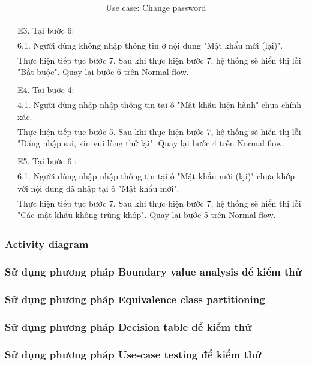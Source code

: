 \documentclass[a4paper, 12pt]{article}
\begin{document}
\begin{table}[H]
\begin{tabular}{|l|p{11cm}|}
        & \\
        & E3. Tại bước 6: \\
        & 6.1. Người dùng không nhập thông tin ở nội dung "Mật khẩu mới (lại)". \\
        & Thực hiện tiếp tục bước 7. Sau khi thực hiện bước 7, hệ thống sẽ hiển thị lỗi "Bắt buộc". Quay lại bước 6 trên Normal flow. \\
        & \\
        & E4. Tại bước 4: \\
        & 4.1. Người dùng nhập nhập thông tin tại ô "Mật khẩu hiện hành" chưa chính xác. \\
        & Thực hiện tiếp tục bước 5. Sau khi thực hiện bước 7, hệ thống sẽ hiển thị lỗi "Đăng nhập sai, xin vui lòng thử lại". Quay lại bước 4 trên Normal flow. \\
        & \\
        & E5. Tại bước 6 : \\
        & 6.1. Người dùng nhập nhập thông tin tại ô "Mật khẩu mới (lại)" chưa khớp với nội dung đã nhập tại ô "Mật khẩu mới". \\
        & Thực hiện tiếp tục bước 7. Sau khi thực hiện bước 7, hệ thống sẽ hiển thị lỗi "Các mật khẩu không trùng khớp". Quay lại bước 5 trên Normal flow. \\
        \hline
    \end{tabular}
    \caption{Use case: Change password}
    \label{Use case: Change password}
\end{table}
\subsubsection{Activity diagram}
\subsubsection{Sử dụng phương pháp Boundary value analysis để kiểm thử}
\subsubsection{Sử dụng phương pháp Equivalence class partitioning}
\subsubsection{Sử dụng phương pháp Decision table để kiểm thử}
\subsubsection{Sử dụng phương pháp Use-case testing để kiểm thử}
\end{document}

